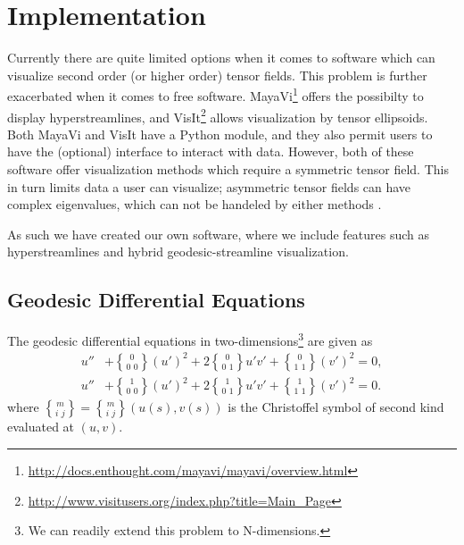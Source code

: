 \documentclass[main.tex]{subfiles}
\begin{document}
\section{Implementation}
\label{sec:4}

Currently there are quite limited options when it comes to software which can visualize 
second order (or higher order) tensor fields. This problem is further exacerbated when it
comes to free software. MayaVi\footnote{\url{http://docs.enthought.com/mayavi/mayavi/overview.html}} 
offers the possibilty to display hyperstreamlines, and 
VisIt\footnote{\url{http://www.visitusers.org/index.php?title=Main_Page}} allows 
visualization by tensor ellipsoids. Both MayaVi and VisIt have a Python module,  
and they also permit users to have the (optional) interface to interact with data.
However, both of these software offer visualization methods which require a symmetric tensor field.
This in turn limits data a user can visualize; asymmetric tensor fields can have complex
eigenvalues, which can not be handeled by either methods \cite{CPL11}.

As such we have created our own software, where we include features such as hyperstreamlines and hybrid 
geodesic-streamline visualization.

\subsection{Geodesic Differential Equations}

The geodesic differential equations in two-dimensions\footnote{We can readily 
extend this problem to N-dimensions.} are given as
\begin{align*}
u'' &+ {0\brace 0\,\,0}\left(u'\right)^2 + 2{0\brace 0\,\,1}
u'v' + {0\brace 1\,\,1}\left(v'\right)^2 = 0,\\ 
u'' &+ {1\brace 0\,\,0}\left(u'\right)^2 + 2{1\brace 0\,\,1}
u'v' + {1\brace 1\,\,1}\left(v'\right)^2 = 0.
\end{align*}
where ${m\brace i\,\,j} = {m\brace i\,\,j}\left(u(s),v(s)\right)$ is the 
Christoffel symbol of second kind evaluated at $(u,v)$. \
\end{document}
